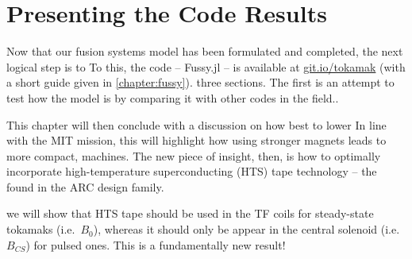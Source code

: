 %
%
%
%
%
%
%
%

\chapter{Presenting the Code Results}

Now that our fusion systems model has been formulated and completed, the next logical step is to  To this, the code  -- Fussy.jl -- is available at \href{http://git.io/tokamak}{git.io/tokamak} (with a short guide given in \cref{chapter:fussy}).  three sections. The first is an attempt to test how  the model is by comparing it with other codes in the field.\cite{arc,eupulsed,process}. 

This chapter will then conclude with a discussion on how best to lower  In line with the MIT mission, this will highlight how using stronger magnets leads to more compact,  machines. The new piece of insight, then, is how to optimally incorporate high-temperature superconducting (HTS) tape technology -- the  found in the ARC design family.

 we will show that HTS tape should be used in the TF coils for steady-state tokamaks (i.e.\ $B_0$), whereas it should only be appear in the central solenoid (i.e.\ $B_{CS}$) for pulsed ones. This is a fundamentally new result!

